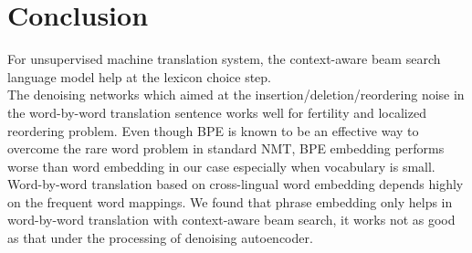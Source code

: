 \chapter{Conclusion}


For unsupervised machine translation system, the context-aware beam search language model help at the lexicon choice step.\\
The denoising networks which aimed at the insertion/deletion/reordering noise in the word-by-word translation sentence works well for fertility and localized reordering problem. 
Even though BPE is known to be an effective way to overcome the rare word problem in standard NMT, BPE embedding performs worse than word embedding in our case especially when vocabulary is small.\\
Word-by-word translation based on cross-lingual word embedding depends highly on the frequent word mappings. We found that phrase embedding only helps in word-by-word translation with context-aware beam search, it works not as good as that under the processing of denoising autoencoder.